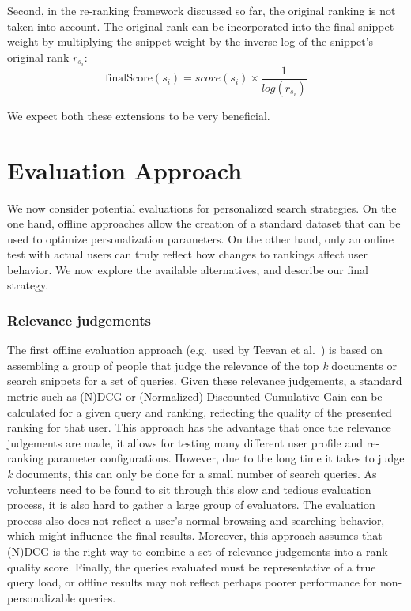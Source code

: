 \documentclass{sig-alternate}
\begin{document}
Second, in the re-ranking framework discussed so far, the original ranking is not taken into account. The original rank can be incorporated into the final snippet weight by multiplying the snippet weight by the inverse log of the snippet's original rank $r_{s_i}$:
\begin{equation}
\mathrm{finalScore}(s_i) = score(s_i) \times \frac{1}{log(r_{s_i})}
\end{equation}

We expect both these extensions to be very beneficial.

\section{Evaluation Approach}

We now consider potential evaluations for personalized search strategies. On the one hand, offline approaches allow the creation of a standard dataset that can be used to optimize personalization parameters. On the other hand, only an online test with actual users can truly reflect how changes to rankings affect user behavior. We now explore the available alternatives, and describe our final strategy.

\subsubsection*{Relevance judgements}

The first offline evaluation approach (e.g.~used by Teevan et al.~\cite{Teevan:Main}) is based on assembling a group of people that judge the relevance of the top \emph{k} documents or search snippets for a set of queries. Given these relevance judgements, a standard metric such as  (N)DCG or (Normalized) Discounted Cumulative Gain \cite{ADD} can be calculated for a given query and ranking, reflecting the quality of the presented ranking for that user. This approach has the advantage that once the relevance judgements are made, it allows for testing many different user profile and re-ranking parameter configurations. However, due to the long time it takes to judge \emph{k} documents, this can only be done for a small number of search queries. As volunteers need to be found to sit through this slow and tedious evaluation process, it is also hard to gather a large group of evaluators. The evaluation process also does not reflect a user's normal browsing and searching behavior, which might influence the final results. Moreover, this approach assumes that (N)DCG is the right way to combine a set of relevance judgements into a rank quality score. Finally, the queries evaluated must be representative of a true query load, or offline results may not reflect perhaps poorer performance for non-personalizable queries. 
\end{document}
